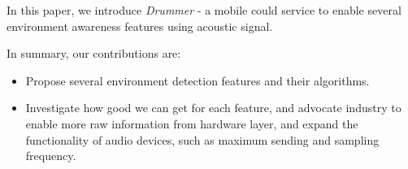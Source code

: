 In this paper, we introduce {\em Drummer} - a mobile could service to enable several environment awareness 
features using acoustic signal. 



In summary, our contributions are:

\begin{itemize}

\item Propose several environment detection features and their algorithms.

\item Investigate how good we can get for each feature, and advocate industry to enable 
more raw information from hardware layer, and expand the functionality of audio devices, 
such as maximum sending and sampling frequency.

\end{itemize}












